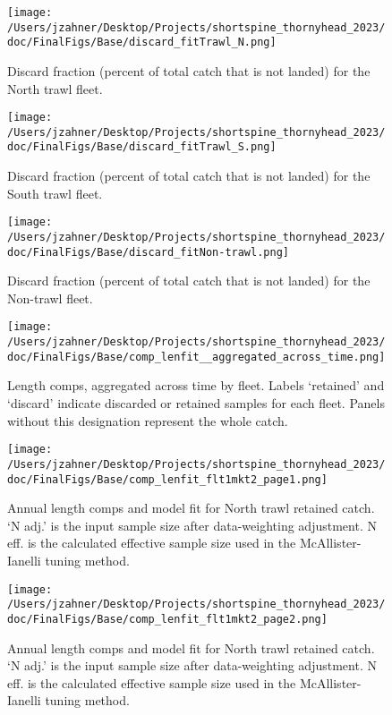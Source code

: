 \documentclass[11pt,
  english,
  letterpaper,
]{article}
\begin{document}
\begin{figure}
\centering
\texttt{[image: /Users/jzahner/Desktop/Projects/shortspine\_thornyhead\_2023/doc/FinalFigs/Base/discard\_fitTrawl\_N.png]}
\caption{Discard fraction (percent of total catch that is not landed) for the North trawl fleet.\label{fig:northtrl_disc}}
\end{figure}

\begin{figure}
\centering
\texttt{[image: /Users/jzahner/Desktop/Projects/shortspine\_thornyhead\_2023/doc/FinalFigs/Base/discard\_fitTrawl\_S.png]}
\caption{Discard fraction (percent of total catch that is not landed) for the South trawl fleet.\label{fig:southtrl_disc}}
\end{figure}

\begin{figure}
\centering
\texttt{[image: /Users/jzahner/Desktop/Projects/shortspine\_thornyhead\_2023/doc/FinalFigs/Base/discard\_fitNon-trawl.png]}
\caption{Discard fraction (percent of total catch that is not landed) for the Non-trawl fleet.\label{fig:nontrl_disc}}
\end{figure}

\begin{figure}
\centering
\texttt{[image: /Users/jzahner/Desktop/Projects/shortspine\_thornyhead\_2023/doc/FinalFigs/Base/comp\_lenfit\_\_aggregated\_across\_time.png]}
\caption{Length comps, aggregated across time by fleet. Labels `retained' and `discard' indicate discarded or retained samples for each fleet. Panels without this designation represent the whole catch.\label{fig:lencomps_all}}
\end{figure}

\begin{figure}
\centering
\texttt{[image: /Users/jzahner/Desktop/Projects/shortspine\_thornyhead\_2023/doc/FinalFigs/Base/comp\_lenfit\_flt1mkt2\_page1.png]}
\caption{Annual length comps and model fit for North trawl retained catch. `N adj.' is the input sample size after data-weighting adjustment. N eff. is the calculated effective sample size used in the McAllister-Ianelli tuning method.\label{fig:ntrawl_comps_1}}
\end{figure}

\begin{figure}
\centering
\texttt{[image: /Users/jzahner/Desktop/Projects/shortspine\_thornyhead\_2023/doc/FinalFigs/Base/comp\_lenfit\_flt1mkt2\_page2.png]}
\caption{Annual length comps and model fit for North trawl retained catch. `N adj.' is the input sample size after data-weighting adjustment. N eff. is the calculated effective sample size used in the McAllister-Ianelli tuning method.\label{fig:ntrawl_comps_2}}
\end{figure}
\end{document}
